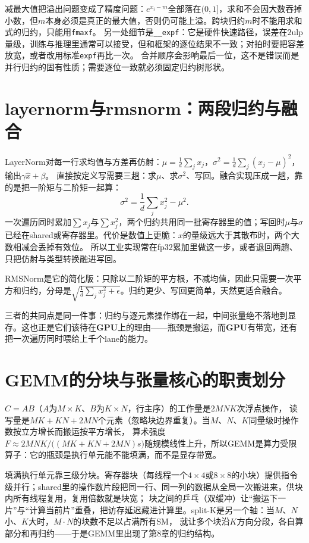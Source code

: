\documentclass[12pt,a4paper,fontset=fandol]{ctexbook}
\newcommand{\Tp}[1]{\texttt{#1}}
\newcommand{\Dom}[1]{\textsf{\bfseries #1}}
\newcommand{\GPU}{\Dom{GPU}}
\begin{document}
减最大值把溢出问题变成了精度问题：$e^{x_i-m}$全部落在$(0,1]$，求和不会因大数吞掉小数，但$m$本身必须是真正的最大值，否则仍可能上溢。跨块归约$m$时不能用求和式的归约，只能用\Tp{fmaxf}。
另一处细节是\Tp{\_\_expf}：它是硬件快速路径，误差在$2$ulp量级，训练与推理里通常可以接受，但和框架的逐位结果不一致；对拍时要把容差放宽，或者改用标准\Tp{expf}再比一次。
合并顺序会影响最后一位，这不是错误而是并行归约的固有性质；需要逐位一致就必须固定归约树形状。

\section{layernorm与rmsnorm：两段归约与融合}

LayerNorm对每一行求均值与方差再仿射：$\mu=\frac{1}{d}\sum_j x_j$，$\sigma^2=\frac{1}{d}\sum_j(x_j-\mu)^2$，输出$\gamma\hat x+\beta$。
直接按定义写需要三趟：求$\mu$、求$\sigma^2$、写回。融合实现压成一趟，靠的是把一阶矩与二阶矩一起算：
\begin{equation}
\sigma^2=\frac{1}{d}\sum_j x_j^2-\mu^2 .
\end{equation}
一次遍历同时累加$\sum x_j$与$\sum x_j^2$，两个归约共用同一批寄存器里的值；写回时$\mu$与$\sigma$已经在shared或寄存器里。代价是数值上更脆：$x$的量级远大于其散布时，两个大数相减会丢掉有效位。
所以工业实现常在fp32累加里做这一步，或者退回两趟、只把仿射与类型转换融进写回。

RMSNorm是它的简化版：只除以二阶矩的平方根，不减均值，因此只需要一次平方和归约，分母是$\sqrt{\frac{1}{d}\sum_jx_j^2+\epsilon}$。归约更少、写回更简单，天然更适合融合。

三者的共同点是同一件事：归约与逐元素操作绑在一起，中间张量绝不落地到显存。这也正是它们该待在\GPU{}上的理由——瓶颈是搬运，而\GPU{}有带宽，还有把一次遍历同时喂给上千个lane的能力。

\section{GEMM的分块与张量核心的职责划分}

$C=A B$（$A$为$M\times K$、$B$为$K\times N$，行主序）的工作量是$2MNK$次浮点操作，
读写量是$MK+KN+2MN$个元素（忽略块边界重复）。当$M$、$N$、$K$同量级时操作数按立方增长而搬运按平方增长，
算术强度$F\approx 2MNK/\bigl((MK+KN+2MN)s\bigr)$随规模线性上升，所以GEMM是算力受限算子：它的瓶颈是执行单元能不能填满，而不是显存带宽。

填满执行单元靠三级分块。寄存器块（每线程一个$4\times 4$或$8\times 8$的小块）提供指令级并行；shared里的操作数片段把同一行、同一列的数据从全局一次搬进来，供块内所有线程复用，复用倍数就是块宽；
块之间的乒乓（双缓冲）让``搬运下一片''与``计算当前片''重叠，把访存延迟藏进计算里。split-K是另一个轴：当$M$、$N$小、$K$大时，$M\cdot N$的块数不足以占满所有SM，
就让多个块沿$K$方向分段，各自算部分和再归约——于是GEMM里出现了第8章的归约结构。
\end{document}
